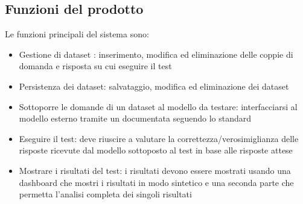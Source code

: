 
\subsection{Funzioni del prodotto}
Le funzioni principali del sistema sono:
\begin{itemize}
    \item Gestione di dataset : inserimento, modifica ed eliminazione delle coppie di domanda e risposta su cui eseguire il test
    \item Persistenza dei dataset: salvataggio, modifica ed eliminazione dei dataset
    \item Sottoporre le domande di un dataset al modello da testare: interfacciarsi al modello esterno tramite un  documentata seguendo lo standard 
    \item Eseguire il test: deve riuscire a valutare la correttezza/verosimiglianza delle risposte ricevute dal modello sottoposto al test in base alle risposte attese
    \item Mostrare i risultati del test: i risultati devono essere mostrati usando una dashboard che mostri i risultati in modo sintetico e una seconda parte che permetta l'analisi completa dei singoli risultati
\end{itemize}